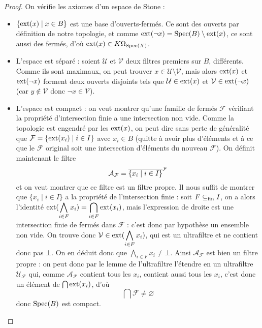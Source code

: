 \begin{proof}
  On vérifie les axiomes d'un espace de Stone :
  \begin{itemize}
  \item $\{\operatorname{ext}(x)\mid x \in B\}$ est une base d'ouverts-fermés. Ce sont des
    ouverts par définition de notre topologie, et comme
    $\operatorname{ext}(\lnot x)=\operatorname{Spec}(B)\setminus\operatorname{ext}(x)$, ce sont aussi des fermés, d'où
    $\operatorname{ext}(x)\in K\Omega_{\operatorname{Spec}(X)}$.
  \item L'espace est séparé : soient $\mathcal U$ et $\mathcal V$ deux filtres
    premiers sur $B$, différents. Comme ils sont maximaux, on peut trouver
    $x\in \mathcal U\setminus \mathcal V$, mais alors $\operatorname{ext}(x)$ et
    $\operatorname{ext}(\lnot x)$ forment deux ouverts disjoints tels que
    $\mathcal U \in\operatorname{ext}(x)$ et $\mathcal V \in\operatorname{ext}(\lnot x)$
    (car $y\notin\mathcal V$ donc $\lnot x \in \mathcal V$).
  \item L'espace est compact : on veut montrer qu'une famille de fermés
    $\mathcal F$ vérifiant la propriété d'intersection finie a une
    intersection non vide. Comme la topologie est engendré par les $\operatorname{ext}(x)$,
    on peut dire sans perte de généralité que
    $\mathcal F = \{\operatorname{ext}(x_i)\mid i\in I\}$ avec $x_i \in B$ (quitte à
    avoir plus d'éléments et à ce que le $\mathcal F$ original soit une
    intersection d'éléments du nouveau $\mathcal F$). On définit maintenant le
    filtre
    \[\mathcal A_\mathcal F = \overline{\{x_i\mid i \in I\}}^{\mathcal F}\]
    et on veut montrer que ce filtre est un filtre propre. Il nous suffit de
    montrer que $\{x_i\mid i \in I\}$ a la propriété de l'intersection finie :
    soit $F\subseteq_{\mathrm{fin}} I$, on a alors l'identité
    $\displaystyle\operatorname{ext}(\bigwedge_{i \in F} x_i) = \bigcap_{i \in F}\operatorname{ext}(x_i)$,
    mais l'expression de droite est une intersection finie de fermés dans
    $\mathcal F$ : c'est donc par hypothèse un ensemble non vide. On trouve
    donc $\mathcal V \in \displaystyle\operatorname{ext}(\bigwedge_{i\in F} x_i)$, qui est un
    ultrafiltre et ne contient donc pas $\bot$. On en déduit donc que
    $\displaystyle\bigwedge_{i \in F} x_i \neq \bot$. Ainsi
    $\mathcal A_\mathcal F$ est bien un filtre propre : on peut donc par le
    lemme de l'ultrafiltre l'étendre en un ultrafiltre $\mathcal U_\mathcal F$
    qui, comme $\mathcal A_\mathcal F$ contient tous les $x_i$, contient aussi
    tous les $x_i$, c'est donc un élément de $\bigcap \operatorname{ext}(x_i)$, d'où
    \[\bigcap \mathcal F \neq \varnothing\]
    donc $\operatorname{Spec}(B)$ est compact.
  \end{itemize}
\end{proof}

